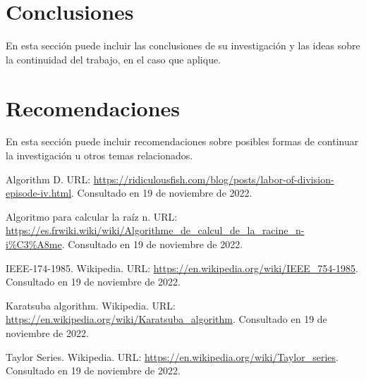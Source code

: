 \documentclass[a4paper,10pt,twocolumn]{article}
\begin{document}
\section{Conclusiones}\label{sec:conc}

  En esta sección puede incluir las conclusiones de su investigación y las ideas
  sobre la continuidad del trabajo, en el caso que aplique.




\section{Recomendaciones}\label{sec:rec}

  En esta sección puede incluir recomendaciones sobre posibles formas de continuar
  la investigación u otros temas relacionados.




\begin{thebibliography}{99}
	 Algorithm D. URL: \href{https://ridiculousfish.com/blog/posts/labor-of-division-episode-iv.html}
	  {https://ridiculousfish.com/blog/posts/labor-of-division-episode-iv.html}.
		Consultado en 19 de noviembre de 2022.
		
	 Algoritmo para calcular la raíz n. URL: \href{https://es.frwiki.wiki/wiki/Algorithme_de_calcul_de_la_racine_n-i\%C3\%A8me}
	  {https://es.frwiki.wiki/wiki/Algorithme\_de\_calcul\_de\_la\_racine\_n-i\%C3\%A8me}.
		Consultado en 19 de noviembre de 2022.
	
	 IEEE-174-1985. Wikipedia. URL: \href{https://en.wikipedia.org/wiki/IEEE_754-1985}
	  {https://en.wikipedia.org/wiki/IEEE\_754-1985}.
		Consultado en 19 de noviembre de 2022.
		
	 Karatsuba algorithm. Wikipedia. URL: \href{https://en.wikipedia.org/wiki/Karatsuba_algorithm}
	  {https://en.wikipedia.org/wiki/Karatsuba\_algorithm}.
		Consultado en 19 de noviembre de 2022.	
		
	 Taylor Series. Wikipedia. URL: \href{https://en.wikipedia.org/wiki/Taylor_series}
	  {https://en.wikipedia.org/wiki/Taylor\_series}.
		Consultado en 19 de noviembre de 2022.
		
	
	
	
	

\end{thebibliography}


\label{end}
\end{document}
